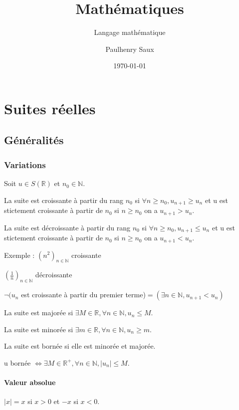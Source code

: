 \documentclass[french]{yLectureNote}
\title{Mathématiques}
\subtitle{Langage mathématique}
\author{Paulhenry Saux}
\date{\today}
\begin{document}
\setcounter{chapter}{1}

	\chapter{Suites réelles }
\section{Généralités}

\subsection{Variations}
Soit $u\in S(\mathbb{R})$ et $n_0 \in \mathbb{N}$.

\begin{theorem}
La suite est croissante à partir du rang $n_0$ si $\forall n\geq n_0, u_{n+1} \geq u_n$ et u est stictement croissante à partir de $n_0$ si $n\geq n_0$ on a $u_{n+1} > u_n$.
\end{theorem}

\begin{theorem}
La suite est décroissante à partir du rang $n_0$ si $\forall n\geq n_0, u_{n+1} \leq u_n$ et u est stictement croissante à partir de $n_0$ si $n\geq n_0$ on a $u_{n+1} < u_n$.
\end{theorem}

Exemple : $(n^2)_{n\in\mathbb{N}}$ croissante

$(\frac{1}{n})_{n\in\mathbb{N}}$ décroissante

$\neg(u_n$ est croissante à partir du premier terme)$ = (\exists n\in\mathbb{N}, u_{n+1}<u_n) $

\begin{theorem}
La suite est majorée si $\exists M\in\mathbb{R}, \forall n\in\mathbb{N}, u_n\leq M$.

La suite est minorée si $\exists m\in\mathbb{R}, \forall n\in\mathbb{N}, u_n\geq m$.

La suite est bornée si elle est minorée et majorée.
\end{theorem}

u bornée $\iff \exists M\in \mathbb{R}^+, \forall n\in \mathbb{N}, |u_n|\leq M$.

\subsubsection{Valeur absolue}
$|x| = x$ si $x>0$ et $-x$ si $x<0$.
\end{document}
